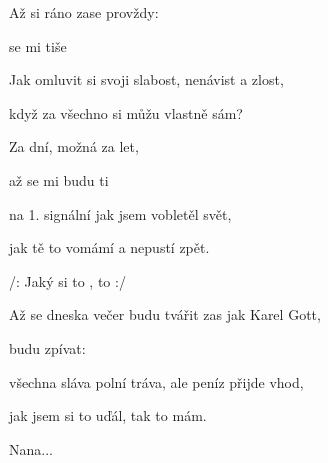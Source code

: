 

\zs
Až si  ráno  zase
 provždy: 

 se mi  tiše 

Jak omluvit si svoji slabost, nenávist a zlost,

když za všechno si můžu vlastně sám?
\ks

\zr
Za  dní, možná za  let,

až se mi  budu ti 

na 1. signální jak jsem vobletěl svět,

jak tě to vomámí a nepustí zpět.

/: Jaký si to ,  to  :/
\kr

\zs
Až se dneska večer budu tvářit zas jak Karel Gott,

budu zpívat: 

všechna sláva polní tráva, ale peníz přijde vhod,

jak jsem si to uďál, tak to mám.
\ks

\zr  \kr

Nana...

\kp






